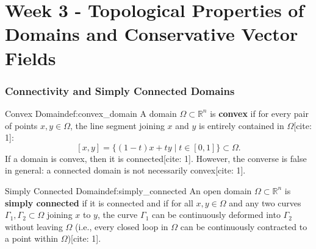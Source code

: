 \chapter{Week 3 - Topological Properties of Domains and Conservative Vector Fields}

\subsection{Connectivity and Simply Connected Domains}

\begin{definition}{Convex Domain}{def:convex_domain}
A domain $\Omega \subset \mathbb{R}^n$ is \textbf{convex} if for every pair of points $x, y \in \Omega$, the line segment joining $x$ and $y$ is entirely contained in $\Omega$[cite: 1]:
\[
[x, y] = \{ (1-t)x + ty \mid t \in [0, 1] \} \subset \Omega.
\]
If a domain is convex, then it is connected[cite: 1]. However, the converse is false in general: a connected domain is not necessarily convex[cite: 1].
\end{definition}

\begin{center}
\end{center}

\begin{definition}{Simply Connected Domain}{def:simply_connected}
An open domain $\Omega \subset \mathbb{R}^n$ is \textbf{simply connected} if it is connected and if for all $x, y \in \Omega$ and any two curves $\Gamma_1, \Gamma_2 \subset \Omega$ joining $x$ to $y$, the curve $\Gamma_1$ can be continuously deformed into $\Gamma_2$ without leaving $\Omega$ (i.e., every closed loop in $\Omega$ can be continuously contracted to a point within $\Omega$)[cite: 1].
\end{definition}

